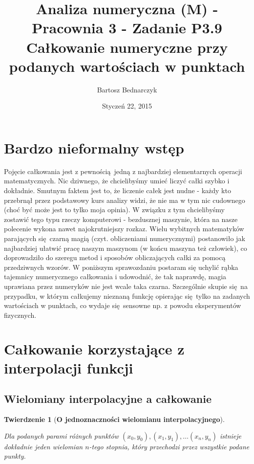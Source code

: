 \documentclass{article}
\title{Analiza numeryczna (M) - Pracownia 3 - Zadanie P3.9\\
Całkowanie numeryczne przy podanych wartościach w punktach\\}
\date{Styczeń 22, 2015}
\author{Bartosz Bednarczyk}
\newtheorem{thm}{Twierdzenie}
\begin{document}
\maketitle

\tableofcontents

\section{Bardzo nieformalny wstęp}

Pojęcie całkowania jest z pewnością jedną z najbardziej elementarnych operacji matematycznych. Nic dziwnego, że chcielibyśmy umieć liczyć całki szybko i dokładnie. Smutnym faktem jest to, że liczenie całek jest nudne - każdy kto przebrnął przez podstawowy kurs analizy widzi, że nie ma w tym nic cudownego (choć być może jest to tylko moja opinia). W związku z tym chcielibyśmy zostawić tego typu rzeczy komputerowi - bezdusznej maszynie, która na nasze polecenie wykona nawet najokrutniejszy rozkaz. Wielu wybitnych matematyków parających się czarną magią (czyt. obliczeniami numerycznymi) postanowiło jak najbardziej ułatwić pracę naszym maszynom (w końcu maszyna też człowiek), co doprowadziło do szeregu metod i sposobów obliczających całki za pomocą przedziwnych wzorów. W poniższym sprawozdaniu postaram się uchylić rąbka tajemnicy numerycznego całkowania i udowodnić, że tak naprawdę, magia uprawiana przez numeryków nie jest wcale taka czarna. Szczególnie skupie się na przypadku, w którym całkujemy nieznaną funkcję opierając się tylko na zadanych wartościach w punktach, co wydaje się sensowne np. z powodu eksperymentów fizycznych.

\pagebreak

\section{Całkowanie korzystające z interpolacji funkcji}


\subsection{Wielomiany interpolacyjne a całkowanie}

\begin{thm}[\textbf{O jednoznaczności wielomianu interpolacyjnego}]
\label{twr:jednoznacznosc_interpolacyjnego}

Dla podanych parami różnych punktów $(x_0, y_0), (x_1, y_1), \ldots (x_n, y_n)$ istnieje dokładnie jeden wielomian $n$-tego stopnia, który przechodzi przez wszystkie podane punkty.	
\end{thm}
\end{document}
